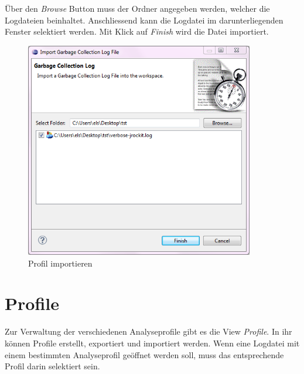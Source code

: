 Über den \textit{Browse} Button muss der Ordner angegeben werden, welcher die Logdateien beinhaltet. Anschliessend kann die Logdatei im darunterliegenden Fenster selektiert werden. Mit Klick auf \textit{Finish} wird die Datei importiert.
 \begin{figure}[H]
  	\centering
    	\includegraphics[width=10cm]{images/tutorial_importlog}
        	\caption{Profil importieren}
\end{figure}

\section{Profile}
Zur Verwaltung der verschiedenen Analyseprofile gibt es die View \textit{Profile}. In ihr können Profile erstellt, exportiert und importiert werden. Wenn eine Logdatei mit einem bestimmten Analyseprofil geöffnet werden soll, muss das entsprechende Profil darin selektiert sein.

